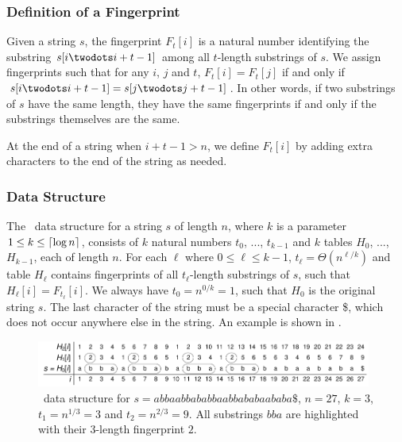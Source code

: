\documentclass[a4]{article}
\newcommand*{\pref}{\prettyref}
\begin{document}
\subsubsection{Definition of a Fingerprint}

Given a string $s$, the fingerprint $F_t[i]$ is a natural number identifying the substring $s[i\twodots i+t-1]$ among all $t$-length substrings of $s$. We assign fingerprints such that for any $i$, $j$ and $t$, $F_t[i] = F_t[j]$ if and only if $s[i\twodots i+t-1] = s[j\twodots j+t-1]$. In other words, if two substrings of $s$ have the same length, they have the same fingerprints if and only if the substrings themselves are the same.

At the end of a string when $i+t-1>n$, we define $F_t[i]$ by adding extra characters to the end of the string as needed.

\subsubsection{Data Structure\label{sec:fingerprint-ds}}

The \fprintk\ data structure for a string $s$ of length $n$, where $k$ is a parameter $1 \leq k \leq \lceil\log n\rceil$, consists of $k$ natural numbers $t_0$, ..., $t_{k-1}$ and $k$ tables $H_0$, ..., $H_{k-1}$, each of length $n$. For each $\ell$ where $0\leq \ell\leq k-1$, $t_\ell = \Theta(n^{\ell/k})$ and table $H_\ell$ contains fingerprints of all $t_\ell$-length substrings of $s$, such that $H_\ell[i] = F_{t_\ell}[i]$. We always have $t_0 = n^{0/k} = 1$, such that $H_0$ is the original string $s$. The last character of the string must be a special character \$, which does not occur anywhere else in the string. An example is shown in \pref{fig:fingerprint-ds}.

\begin{figure}[tp]
    \begin{center}
        \includegraphics[width=0.98\textwidth,page=1]{fingerprint.pdf}
    \end{center}
    \caption{\label{fig:fingerprint-ds}\fprintk\ data structure for $s=\textit{abbaabbababbaabbababaababa\$}$, $n=27$, $k=3$, $t_1=n^{1/3}=3$ and $t_2=n^{2/3}=9$. All substrings $\textit{bba}$ are highlighted with their $3$-length fingerprint $2$.}
\end{figure}
\end{document}
